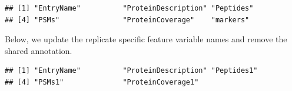 \begin{Shaded}
\begin{Highlighting}[]
\end{Highlighting}
\end{Shaded}

\begin{verbatim}
## [1] "EntryName"          "ProteinDescription" "Peptides"          
## [4] "PSMs"               "ProteinCoverage"    "markers"
\end{verbatim}

Below, we update the replicate specific feature variable names and
remove the shared annotation.

\begin{Shaded}
\begin{Highlighting}[]
\NormalTok{(hyperLOPIT2015ms3r1)[}\NormalTok{:}\NormalTok{] <-}\StringTok{ }\NormalTok{(}\NormalTok{(hyperLOPIT2015ms3r1)[}\NormalTok{:}\NormalTok{], }\NormalTok{)}
\NormalTok{(hyperLOPIT2015ms3r2)[}\NormalTok{:}\NormalTok{] <-}\StringTok{ }\NormalTok{(}\NormalTok{(hyperLOPIT2015ms3r2)[}\NormalTok{:}\NormalTok{], }\NormalTok{)}
\StringTok{ }\NormalTok{(hyperLOPIT2015ms3r1)[}\NormalTok{:}\NormalTok{] }
\StringTok{ }\NormalTok{(hyperLOPIT2015ms3r2)[}\NormalTok{:}\NormalTok{]}
\end{Highlighting}
\end{Shaded}

\begin{verbatim}
## [1] "EntryName"          "ProteinDescription" "Peptides1"         
## [4] "PSMs1"              "ProteinCoverage1"
\end{verbatim}

\begin{Shaded}
\begin{Highlighting}[]
\end{Highlighting}
\end{Shaded}

